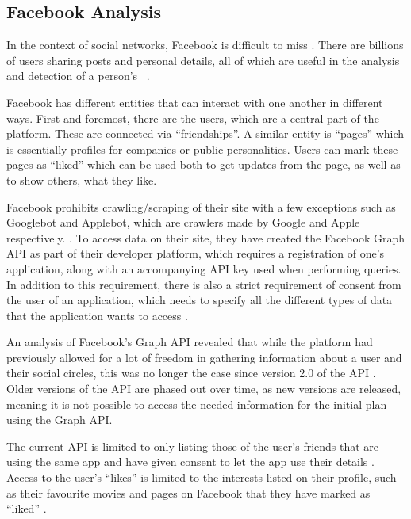 \subsection{Facebook Analysis}\label{sec:facebook-analysis}
In the context of social networks, Facebook is difficult to miss
\citep{FacebookPopularity}.
There are billions of users sharing posts and personal details, all of which are
useful in the analysis and detection of a person's \fb\ .\nl

Facebook has different entities that can interact with one another in different ways.
First and foremost, there are the users, which are a central part of the
platform. These are connected via ``friendships''.
A similar entity is ``pages'' which is essentially profiles for companies or
public personalities.
Users can mark these pages as ``liked'' which can be used both to get updates
from the page, as well as to show others, what they like.\nl

Facebook prohibits crawling/scraping of their site with a few exceptions such as
Googlebot and Applebot, which are crawlers made by Google and Apple
respectively. \citep{FacebookRobotsTxt}.
To access data on their site, they have created the Facebook Graph API as part
of their developer platform, which requires a registration of one's application,
along with an accompanying API key used when performing queries.
In addition to this requirement, there is also a strict requirement of consent
from the user of an application, which needs to specify all the different types
of data that the application wants to access \citep{FacebookGraphApiAccessTokens}.\nl

An analysis of Facebook's Graph API \citep{FacebookGraphApiDocumentation} revealed that while the platform had
previously allowed for a lot of freedom in gathering information about a user
and their social circles, this was no longer the case since version 2.0 of the
API \citep{FacebookChangesInGraphTwoPointOh}.
Older versions of the API are phased out over time, as new versions are released, meaning it is not possible to access
the needed information for the initial plan using the Graph
API.\nl

The current API is limited to only listing those of the user's friends that are using the same app and have given
consent to let the app use their details \citep{FacebookChangesInGraphTwoPointOh}.
Access to the user's ``likes'' is limited to the interests listed on their profile, such as their favourite movies and
pages on Facebook that they have marked as ``liked''
\citep{FacebookGraphApiUserLikes} \citep{FacebookGraphApiUserEdges}.\nl

